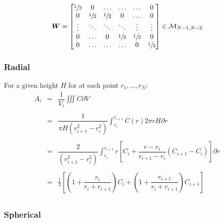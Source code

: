 \documentclass[aps,onecolumn,11pt]{revtex4}
\newcommand{\half}{{\sfrac{1}{2}}}
\newcommand{\mat}[1]{{\bm{#1}}}
\begin{document}
\begin{equation}
	\mat{W} = 
	\begin{bmatrix}
	\half & 0     & \ldots &\ldots & \ldots & 0 \\
	 0    & \half & \half & 0     & \ldots & 0 \\
	 \vdots & \ddots & \ddots & \ddots & \vdots & \vdots \\
	 0      & \ldots & 0& \half& \half  &  0     \\ 
	 0      & \ldots & \ldots & \ldots &  0 & \half \\                
	\end{bmatrix} \in \mathcal{M}_{N-1,N-2}
\end{equation}




\subsubsection{Radial}

For a given height $H$ for at each point $r_1,\ldots,r_N$:
\begin{equation}
\begin{array}{rcl}
	A_i & = & \displaystyle\dfrac{1}{V_i} \iiint C \partial V \\
	\\
	& = & \displaystyle \dfrac{1}{\pi H \left( r_{i+1}^2 - r_{i}^2 \right)} \int_{r_i}^{r_{i+1}} C(r) 2\pi r H \partial r\\
	\\
	& = & \displaystyle \dfrac{2}{\left( r_{i+1}^2 - r_{i}^2 \right)} \int_{r_i}^{r_{i+1}}   r \left[ C_{i} + \dfrac{r-r_i}{r_{i+1}-r_i} \left(C_{i+1}-C_{i}\right) \right]  \partial r\\ \\
	& = & \displaystyle \frac{1}{3} \left[ \left(1+\dfrac{r_i}{r_i+r_{i+1}}\right) C_i + \left(1+\dfrac{r_{i+1}}{r_i+r_{i+1}}\right) C_{i+1} \right]\\\
\end{array}
\end{equation} 

\subsubsection{Spherical}
\end{document}
